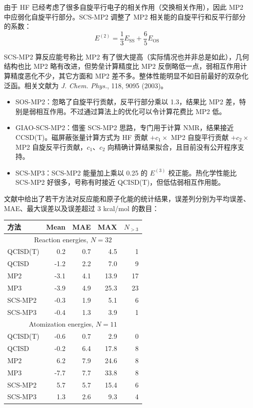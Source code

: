 由于 HF 已经考虑了很多自旋平行电子的相关作用（交换相关作用），因此 MP2 中应弱化自旋平行部分。SCS-MP2 调整了 MP2 相关能的自旋平行和反平行部分的系数：
\[
E^{(2)}=\frac{1}{3}E_{\mathrm{SS}}+\frac{6}{5}E_{\mathrm{OS}}
\]

SCS-MP2 算反应能号称比 MP2 有了很大提高（实际情况也并非总是如此），几何结构也比 MP2 略有改进，但势垒计算精度比 MP2 反倒略低一点，弱相互作用计算精度恶化不少，其它方面和 MP2 差不多。整体性能明显不如目前最好的双杂化泛函。相关文献为 \textit{J. Chem. Phys.}, 118, 9095 (2003)。

\begin{itemize}
  \item SOS-MP2：忽略了自旋平行贡献，反平行部分乘以 1.3，结果比 MP2 差，特别是弱相互作用。不过通过算法上的优化可以令计算花费比 MP2 低。
  \item GIAO-SCS-MP2：借鉴 SCS-MP2 思路，专门用于计算 NMR，结果接近 CCSD(T)。磁屏蔽张量计算方式为 HF 贡献 $+c_1\times$ MP2 自旋平行贡献 $+c_2\times$ MP2 自旋反平行贡献，$c_1$、$c_2$ 向精确计算结果拟合，且目前没有公开程序支持。
  \item SCS-MP3：SCS-MP2 能量加上乘以 0.25 的 $E^{(3)}$ 校正能。热化学性能比 SCS-MP2 好很多，号称有时接近 QCISD(T)，但低估弱相互作用能。
\end{itemize}

文献中给出了若干方法对反应能和原子化能的统计结果，误差列分别为平均误差、MAE、最大误差以及误差超过 3 kcal/mol 的数目：

\begin{center}
\small
\begin{tabular}{lrrrr}
\toprule
方法 & Mean & MAE & MAX & $N_{>3}$ \\
\midrule
\multicolumn{5}{c}{Reaction energies, $N=32$} \\
QCISD(T) & 0.2 & 0.7 & 4.5 & 1 \\
QCISD & -1.2 & 2.2 & 7.0 & 9 \\
MP2 & -3.1 & 4.1 & 13.9 & 17 \\
MP3 & -3.9 & 4.9 & 25.3 & 23 \\
SCS-MP2 & -0.3 & 1.9 & 5.1 & 6 \\
SCS-MP3 & -0.4 & 1.3 & 3.9 & 1 \\
\midrule
\multicolumn{5}{c}{Atomization energies, $N=11$} \\
QCISD(T) & -0.6 & 0.7 & 2.9 & 0 \\
QCISD & -0.2 & 6.4 & 17.8 & 8 \\
MP2 & 6.2 & 7.9 & 24.6 & 8 \\
MP3 & -7.7 & 7.7 & 33.8 & 8 \\
SCS-MP2 & 5.7 & 5.7 & 15.4 & 6 \\
SCS-MP3 & 1.3 & 2.6 & 9.3 & 4 \\
\bottomrule
\end{tabular}
\normalsize
\end{center}

